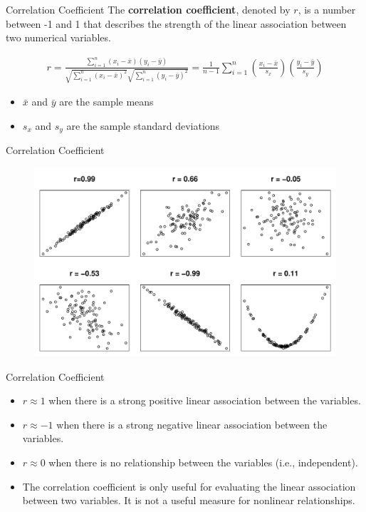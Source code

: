 \documentclass[10pt]{beamer}
\begin{document}
\begin{frame}{Correlation Coefficient}
The \textbf{correlation coefficient}, denoted by $r$, is a number between -1 and 1 that describes the strength of the linear association between two numerical variables.

\begin{align*}
r = \frac{\sum_{i=1}^n (x_i - \bar{x}) (y_i - \bar{y})}{\sqrt{\sum_{i=1}^n (x_i - \bar{x})^2} \sqrt{\sum_{i=1}^n (y_i - \bar{y})^2}} = \frac{1}{n-1} \sum_{i=1}^n \left(\frac{x_i - \bar{x}}{s_x} \right) \left( \frac{y_i - \bar{y}}{s_y} \right)
\end{align*}
\begin{itemize}
\item $\bar{x}$ and $\bar{y}$ are the sample means
\item $s_x$ and $s_y$ are the sample standard deviations
\end{itemize}
\end{frame}

\begin{frame}{Correlation Coefficient}
\begin{figure}
\includegraphics[scale=0.5]{figure/correlations.pdf}
\end{figure}
\end{frame}

\begin{frame}{Correlation Coefficient}
\begin{itemize}
\item $r \approx 1$ when there is a strong positive linear association between the variables.
\vspace{5pt}
\item $r \approx -1$ when there is a strong negative linear association between the variables.
\vspace{5pt}
\item $r \approx 0$ when there is no relationship between the variables (i.e., independent).
\vspace{5pt}
\item The correlation coefficient is only useful for evaluating the linear association between two variables.  It is not a useful measure for nonlinear relationships.
\end{itemize}
\end{frame}
\end{document}
